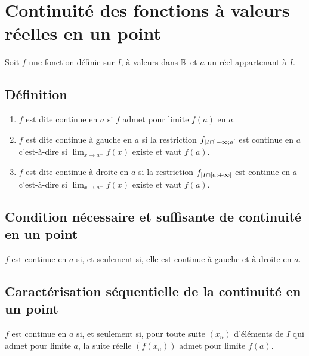 \section{Continuité des fonctions à valeurs réelles en un point}
Soit \(f\) une fonction définie sur \(I\), à valeurs dans \(\mathbb{R}\) et \(a\) un réel appartenant à \(I\).
\subsection{Définition}
\begin{defi}
    \begin{enumerate}
        \item \(f\) est dite continue en \(a\) si \(f\) admet pour limite \(f (a)\) en \(a\).
        \item \(f\) est dite continue à gauche en \(a\) si la restriction \(f_{|I\cap\left]-\infty;a\right[}\) est continue en \(a\) c’est-à-dire si \(\lim_{ x\to a^-}f(x)\) existe et vaut \(f (a)\).
        \item \(f\) est dite continue à droite en \(a\) si la restriction \(f_{|I\cap\left]a;+\infty\right[}\) est continue en \(a\) c’est-à-dire si \(\lim_{ x\to a^+}f(x)\) existe et vaut \(f (a)\).
    \end{enumerate}
\end{defi}
\subsection{Condition nécessaire et suffisante de continuité en un point}
\begin{defprop}
     \(f\) est continue en \(a\) si, et seulement si, elle est continue à gauche et à droite en \(a\).
\end{defprop}
\subsection{Caractérisation séquentielle de la continuité en un point}
\begin{defprop}
     \(f\) est continue en \(a\) si, et seulement si, pour toute suite \((x_n)\) d’éléments de \(I\) qui admet pour limite \(a\), la suite réelle \((f (x_n))\) admet pour limite \(f (a)\).
\end{defprop}

